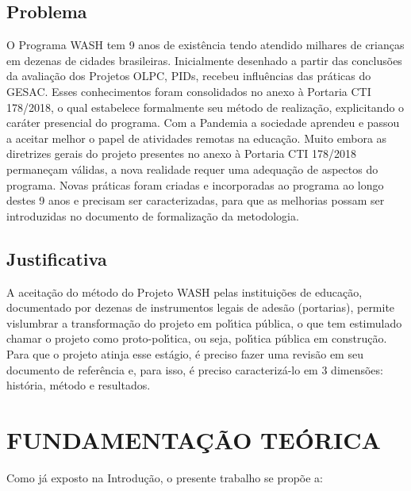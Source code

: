 \documentclass[
12pt,		%
openright,	%
twoside,  %
a4paper,			%
chapter=TITLE,		%
english,			%
french,				%
spanish,			%
brazil				%
]{USPSC-classe/USPSC_RedarTex}
\begin{document}
\section[Problema]{Problema}\label{Problema}
O Programa WASH tem 9 anos de exist\^encia tendo atendido milhares de crian\c{c}as em dezenas de cidades brasileiras. Inicialmente desenhado a partir das conclus\~oes da avalia\c{c}\~ao dos Projetos OLPC, PIDs, recebeu influ\^encias das pr\'aticas do GESAC. Esses conhecimentos foram consolidados no anexo \`a Portaria CTI 178/2018, o qual estabelece formalmente seu m\'etodo de realiza\c{c}\~ao, explicitando o car\'ater presencial do programa. Com a Pandemia a sociedade aprendeu e passou a aceitar melhor o papel de atividades remotas na educa\c{c}\~ao. Muito embora as diretrizes gerais do projeto presentes no anexo \`a Portaria CTI 178/2018 permane\c{c}am v\'alidas, a nova realidade requer uma adequa\c{c}\~ao de aspectos do programa. Novas pr\'aticas foram criadas e incorporadas ao programa ao longo destes 9 anos e precisam ser caracterizadas, para que as melhorias possam ser introduzidas no documento de formaliza\c{c}\~ao da metodologia.








\section[Justificativa]{Justificativa}\label{Justificativa}
A aceita\c{c}\~ao do m\'etodo do Projeto WASH pelas institui\c{c}\~oes de educa\c{c}\~ao, documentado por dezenas de instrumentos legais de ades\~ao (portarias), permite vislumbrar a transforma\c{c}\~ao do projeto em pol\'{\i}tica p\'ublica, o que tem estimulado chamar o projeto como \textquotedbl proto-pol\'{\i}tica\textquotedbl , ou seja, pol\'{\i}tica p\'ublica em constru\c{c}\~ao. Para que o projeto atinja esse est\'agio, \'e preciso fazer uma revis\~ao em seu documento de refer\^encia e, para isso, \'e preciso caracteriz\'a-lo em 3 dimens\~oes: hist\'oria, m\'etodo e resultados.








\chapter[FUNDAMENTA\c{C}\~AO TE\'ORICA ]{FUNDAMENTA\c{C}\~AO TE\'ORICA }\label{FUNDAMENTA\c{C}\~AO TE\'ORICA }
Como j\'a exposto na \textquotedbl Introdu\c{c}\~ao\textquotedbl , o presente trabalho se prop\~oe a:
\end{document}
